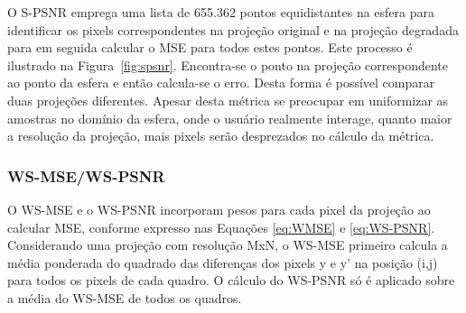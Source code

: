 {O S-PSNR emprega uma lista de 655.362 pontos equidistantes na esfera para identificar os pixels correspondentes na projeção original e na projeção degradada para em seguida calcular o MSE para todos estes pontos. Este processo é ilustrado na Figura~\ref{fig:spsnr}. Encontra-se o ponto na projeção correspondente ao ponto da esfera e então calcula-se o erro. Desta forma é possível comparar duas projeções diferentes. Apesar desta métrica se preocupar em uniformizar as amostras no domínio da esfera, onde o usuário realmente interage, quanto maior a resolução da projeção, mais pixels serão desprezados no cálculo da métrica.

\begin{figure}[h]
        \centering
        \quad
\end{figure}

\subsubsection{WS-MSE/WS-PSNR}

O WS-MSE e o WS-PSNR incorporam pesos para cada pixel da projeção ao calcular MSE, conforme expresso nas Equações \ref{eq:WMSE} e \ref{eq:WS-PSNR}. Considerando uma projeção com resolução MxN, o WS-MSE primeiro calcula a média ponderada do quadrado das diferenças dos pixels y e y' na posição (i,j) para todos os pixels de cada quadro. O cálculo do WS-PSNR só é aplicado sobre a média do WS-MSE de todos os quadros.

}
